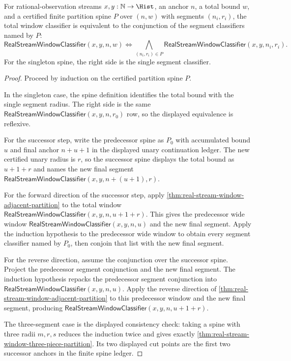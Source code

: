 \begin{theorem}
\label{thm:real-stream-window-finite-partition-fold}
For rational-observation streams $x,y:\mathbb{N}\to\Hist$, an anchor $n$, a
total bound $w$, and a certified finite partition spine $P$ over $(n,w)$ with
segments $(n_i,r_i)$, the total window classifier is equivalent to the
conjunction of the segment classifiers named by $P$:
$$
\mathsf{RealStreamWindowClassifier}(x,y,n,w)
\Longleftrightarrow
\bigwedge_{(n_i,r_i)\in P}
\mathsf{RealStreamWindowClassifier}(x,y,n_i,r_i).
$$
For the singleton spine, the right side is the single segment classifier.
\end{theorem}
\begin{proof}
Proceed by induction on the certified partition spine $P$.

In the singleton case, the spine definition identifies the total bound with the
single segment radius. The right side is the same
$\mathsf{RealStreamWindowClassifier}(x,y,n,r_0)$ row, so the displayed
equivalence is reflexive.

For the successor step, write the predecessor spine as $P_0$ with accumulated
bound $u$ and final anchor $n+u+1$ in the displayed unary continuation ledger.
The new certified unary radius is $r$, so the successor spine displays the
total bound as $u+1+r$ and names the new final segment
$\mathsf{RealStreamWindowClassifier}(x,y,n+(u+1),r)$.

For the forward direction of the successor step, apply
\autoref{thm:real-stream-window-adjacent-partition} to the total window
$\mathsf{RealStreamWindowClassifier}(x,y,n,u+1+r)$. This gives the predecessor
wide window $\mathsf{RealStreamWindowClassifier}(x,y,n,u)$ and the new final
segment. Apply the induction hypothesis to the predecessor wide window to
obtain every segment classifier named by $P_0$, then conjoin that list with the
new final segment.

For the reverse direction, assume the conjunction over the successor spine.
Project the predecessor segment conjunction and the new final segment. The
induction hypothesis repacks the predecessor segment conjunction into
$\mathsf{RealStreamWindowClassifier}(x,y,n,u)$. Apply the reverse direction of
\autoref{thm:real-stream-window-adjacent-partition} to this predecessor window
and the new final segment, producing
$\mathsf{RealStreamWindowClassifier}(x,y,n,u+1+r)$.

The three-segment case is the displayed consistency check: taking a spine with
three radii $m,r,s$ reduces the induction twice and gives exactly
\autoref{thm:real-stream-window-three-piece-partition}. Its two displayed cut
points are the first two successor anchors in the finite spine ledger.
\end{proof}

